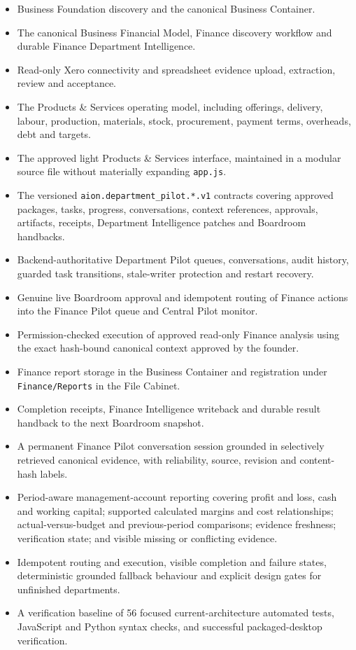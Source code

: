 \begin{itemize}
  \item Business Foundation discovery and the canonical Business Container.
  \item The canonical Business Financial Model, Finance discovery workflow and durable
        Finance Department Intelligence.
  \item Read-only Xero connectivity and spreadsheet evidence upload, extraction, review
        and acceptance.
  \item The Products \& Services operating model, including offerings, delivery, labour,
        production, materials, stock, procurement, payment terms, overheads, debt and
        targets.
  \item The approved light Products \& Services interface, maintained in a modular source
        file without materially expanding \texttt{app.js}.
  \item The versioned \texttt{aion.department\_pilot.*.v1} contracts covering approved
        packages, tasks, progress, conversations, context references, approvals, artifacts,
        receipts, Department Intelligence patches and Boardroom handbacks.
  \item Backend-authoritative Department Pilot queues, conversations, audit history,
        guarded task transitions, stale-writer protection and restart recovery.
  \item Genuine live Boardroom approval and idempotent routing of Finance actions into the
        Finance Pilot queue and Central Pilot monitor.
  \item Permission-checked execution of approved read-only Finance analysis using the exact
        hash-bound canonical context approved by the founder.
  \item Finance report storage in the Business Container and registration under
        \texttt{Finance/Reports} in the File Cabinet.
  \item Completion receipts, Finance Intelligence writeback and durable result handback to
        the next Boardroom snapshot.
  \item A permanent Finance Pilot conversation session grounded in selectively retrieved
        canonical evidence, with reliability, source, revision and content-hash labels.
  \item Period-aware management-account reporting covering profit and loss, cash and working
        capital; supported calculated margins and cost relationships; actual-versus-budget
        and previous-period comparisons; evidence freshness; verification state; and visible
        missing or conflicting evidence.
  \item Idempotent routing and execution, visible completion and failure states, deterministic
        grounded fallback behaviour and explicit design gates for unfinished departments.
  \item A verification baseline of 56 focused current-architecture automated tests, JavaScript and Python syntax
        checks, and successful packaged-desktop verification.
\end{itemize}


